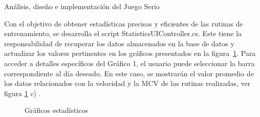\begin{thesischapter}{2} {Análisis, diseño e implementación del Juego Serio}
     
    Con el objetivo de obtener estadísticas precisas y eficientes de las rutinas de entrenamiento, se desarrolla el script StatisticsUIController.cs. 
    Este tiene la responsabilidad de recuperar los datos almacenados en la base de datos y actualizar los valores pertinentes en 
    los gráficos presentados en la figura~\ref{fig: statics-graphs}. Para acceder a detalles específicos del Gráfico 1, el usuario puede 
    seleccionar la barra correspondiente al día deseado. En este caso, se mostrarán el valor promedio %
    de los datos relacionados con la velocidad y la MCV de las rutinas realizadas, ver figura \ref{fig: statics-graphs} c)  .
    
    \begin{figure}[ht]
        \centering

        \caption{Gráficos estadísticos}
        \label{fig: statics-graphs}
    \end{figure}


\end{thesischapter}
